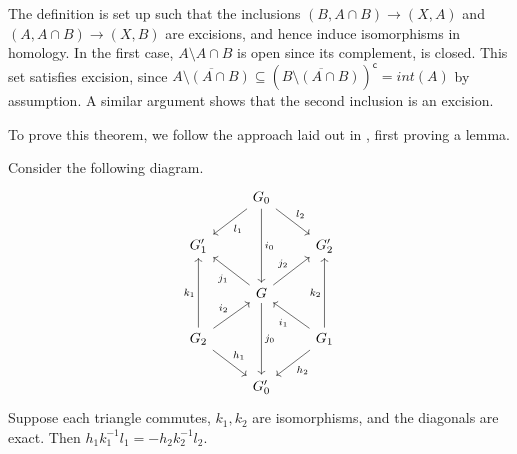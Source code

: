 \begin{remark}\label{mayer-vietoris-excision}
The definition is set up such that the inclusions $(B,A\cap B)\rightarrow(X,A)$ and $(A,A\cap B)\rightarrow(X,B)$ are excisions, and hence induce isomorphisms in homology. In the first case, $A\setminus A\cap B$ is open since its complement, is closed. This set satisfies excision, since $\overline{A\setminus(A\cap B)}\subseteq (\overline{B\setminus(A\cap B)})^{\mathsf{c}}=int(A)$ by assumption. A similar argument shows that the second inclusion is an excision.
\end{remark}

To prove this theorem, we follow the approach laid out in \cite{Eilenberg}, first proving a lemma. 

\begin{lemma}\label{mayer-vietoris-lemma}
Consider the following diagram.
\[\begin{tikzcd}
                                                         & G_0 \arrow[ld, "l_1"] \arrow[rd, "l_2"] \arrow[dd, "i_0"] &                                                           \\
G_1'                                                     &                                                           & G_2'                                                      \\
                                                         & G \arrow[dd, "j_0"] \arrow[lu, "j_1"] \arrow[ru, "j_2"]   &                                                           \\
G_2 \arrow[rd, "h_1"] \arrow[ru, "i_2"] \arrow[uu, "k_1"] &                                                           & G_1 \arrow[ld, "h_2"] \arrow[lu, "i_1"] \arrow[uu, "k_2"] \\
                                                         & G_0'                                                      &                                                          
\end{tikzcd}\]
Suppose each triangle commutes, $k_1,k_2$ are isomorphisms, and the diagonals are exact. Then $h_1k_1^{-1}l_1=-h_2k_2^{-1}l_2$.
\end{lemma}

